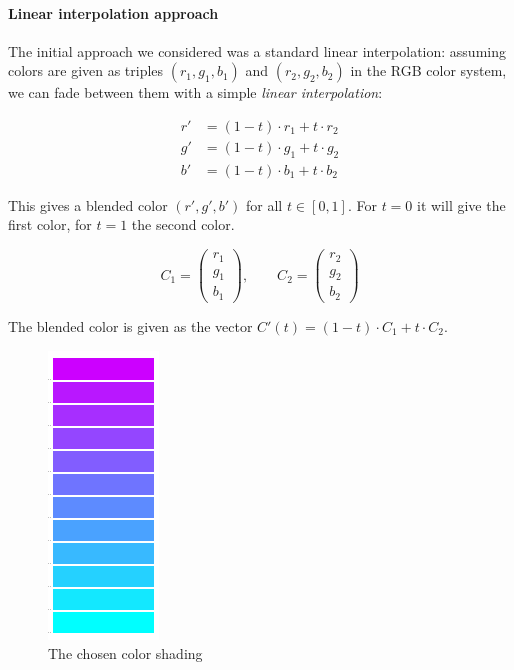 \paragraph{Linear interpolation approach}

The initial approach we considered was a standard linear interpolation: assuming colors are given as triples $(r_1,g_1,b_1)$ and $(r_2,g_2,b_2)$ in the RGB color system, we can fade between them with a simple \textit{linear interpolation}:

\begin{align}
r' &= (1-t)\cdot r_1+t\cdot r_2\\
g' &= (1-t)\cdot g_1+t\cdot g_2\\
b' &= (1-t)\cdot b_1+t\cdot b_2
\end{align}

This gives a blended color $(r',g',b')$ for all $t\in[0,1]$. For $t=0$ it will give the first color, for $t=1$ the second color.


$$ C_1=\begin{pmatrix}r_1\\g_1\\b_1\end{pmatrix}, \qquad C_2=\begin{pmatrix}r_2\\g_2\\b_2\end{pmatrix}$$

The blended color is given as the vector $C'(t)=(1-t)\cdot C_1+t\cdot C_2$.


\begin{figure}
  \centering
    \includegraphics{colorshade1}%
    
  \caption{The chosen color shading}
  \label{fig:color}
\end{figure}


